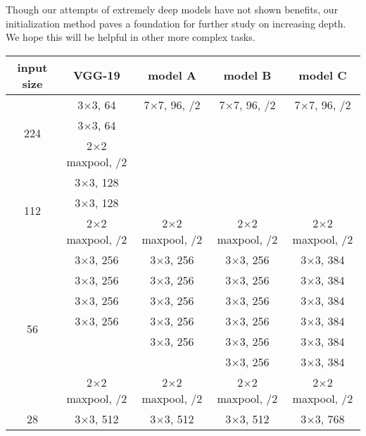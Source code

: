 \documentclass[10pt,twocolumn,letterpaper]{article}
\renewcommand\arraystretch{1.1}
\begin{document}
Though our attempts of extremely deep models have not shown benefits, 
our initialization method paves a foundation for further study on increasing depth. We hope this will be helpful in other more complex tasks.

\renewcommand\arraystretch{1.04}
\setlength{\tabcolsep}{8pt}
\begin{table*}[t]
\begin{center}
\small
\begin{tabular}{|c||c||c|c|c|}
\hline
input size & VGG-19 \cite{Simonyan2014} & model A & model B  & model C \\
\hline
\multirow{3}{*}{224} &  3$\times$3, 64 & 7$\times$7, 96, /2 & 7$\times$7, 96, /2 & 7$\times$7, 96, /2\\
                     &  3$\times$3, 64 &                    &                    &                   \\
                     &  2$\times$2 maxpool, /2 &                 &                    &                   \\
\hline
\multirow{3}{*}{112} &  3$\times$3, 128 &                   &                    &                   \\
                     &  3$\times$3, 128 &                   &                    &                   \\
                     &  2$\times$2 maxpool, /2 & 2$\times$2 maxpool, /2 & 2$\times$2 maxpool, /2  & 2$\times$2 maxpool, /2\\
\hline
\multirow{7}{*}{56} &  3$\times$3, 256 &  3$\times$3, 256 &  3$\times$3, 256  &  3$\times$3, 384\\
                    &  3$\times$3, 256 &  3$\times$3, 256 &  3$\times$3, 256  &  3$\times$3, 384\\
                    &  3$\times$3, 256 &  3$\times$3, 256 &  3$\times$3, 256  &  3$\times$3, 384\\
                    &  3$\times$3, 256 &  3$\times$3, 256 &  3$\times$3, 256  &  3$\times$3, 384\\
                    &                  &  3$\times$3, 256 &  3$\times$3, 256  &  3$\times$3, 384\\
                    &                  &                  &  3$\times$3, 256  &  3$\times$3, 384\\
                    &  2$\times$2 maxpool, /2 & 2$\times$2 maxpool, /2 & 2$\times$2 maxpool, /2 & 2$\times$2 maxpool, /2\\
\hline
\multirow{7}{*}{28} &  3$\times$3, 512 &  3$\times$3, 512 &  3$\times$3, 512  &  3$\times$3, 768\\

\end{tabular}
\end{center}
\end{table*}
\end{document}
